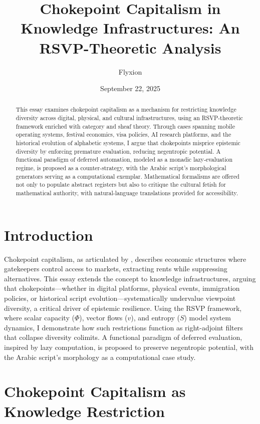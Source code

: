 \documentclass[12pt]{article}
\title{Chokepoint Capitalism in Knowledge Infrastructures: An RSVP-Theoretic Analysis}
\author{Flyxion}
\date{September 22, 2025}
\begin{document}
\maketitle
\begin{abstract}
This essay examines chokepoint capitalism as a mechanism for restricting knowledge diversity across digital, physical, and cultural infrastructures, using an RSVP-theoretic framework enriched with category and sheaf theory. Through cases spanning mobile operating systems, festival economics, visa policies, AI research platforms, and the historical evolution of alphabetic systems, I argue that chokepoints misprice epistemic diversity by enforcing premature evaluation, reducing negentropic potential. A functional paradigm of deferred automation, modeled as a monadic lazy-evaluation regime, is proposed as a counter-strategy, with the Arabic script’s morphological generators serving as a computational exemplar. Mathematical formalisms are offered not only to populate abstract registers but also to critique the cultural fetish for mathematical authority, with natural-language translations provided for accessibility.
\end{abstract}

\section{Introduction}
Chokepoint capitalism, as articulated by \citet{giblin2022chokepoint}, describes economic structures where gatekeepers control access to markets, extracting rents while suppressing alternatives. This essay extends the concept to knowledge infrastructures, arguing that chokepoints—whether in digital platforms, physical events, immigration policies, or historical script evolution—systematically undervalue viewpoint diversity, a critical driver of epistemic resilience. Using the RSVP framework, where scalar capacity ($\Phi$), vector flows ($v$), and entropy ($S$) model system dynamics, I demonstrate how such restrictions function as right-adjoint filters that collapse diversity colimits. A functional paradigm of deferred evaluation, inspired by lazy computation, is proposed to preserve negentropic potential, with the Arabic script’s morphology as a computational case study.

\section{Chokepoint Capitalism as Knowledge Restriction}
\end{document}

